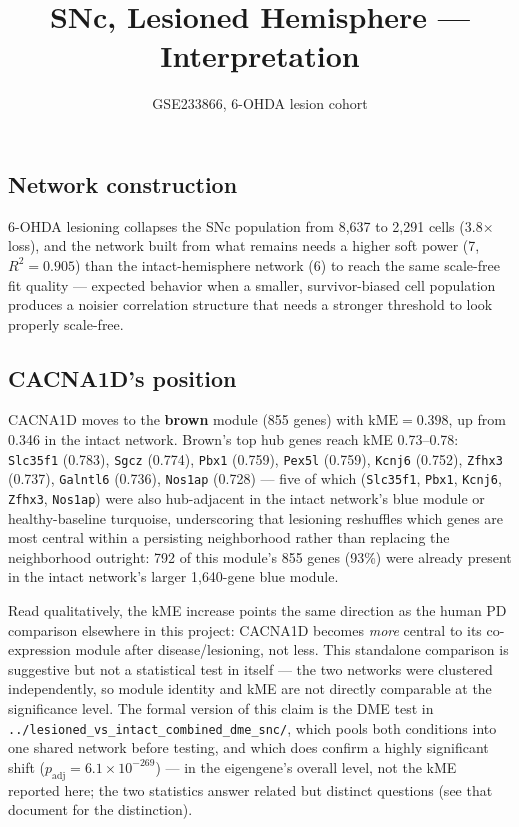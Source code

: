 \documentclass[11pt]{article}
\title{SNc, Lesioned Hemisphere --- Interpretation}
\author{GSE233866, 6-OHDA lesion cohort}
\date{}
\begin{document}
\maketitle

\subsection*{Network construction}

6-OHDA lesioning collapses the SNc population from 8{,}637 to 2{,}291 cells
(3.8$\times$ loss), and the network built from what remains needs a higher
soft power (7, $R^2=0.905$) than the intact-hemisphere network (6) to reach
the same scale-free fit quality --- expected behavior when a smaller,
survivor-biased cell population produces a noisier correlation structure
that needs a stronger threshold to look properly scale-free.

\subsection*{CACNA1D's position}

CACNA1D moves to the \textbf{brown} module (855 genes) with
$\mathrm{kME}=0.398$, up from 0.346 in the intact network. Brown's top hub
genes reach kME 0.73--0.78: \texttt{Slc35f1} (0.783), \texttt{Sgcz}
(0.774), \texttt{Pbx1} (0.759), \texttt{Pex5l} (0.759), \texttt{Kcnj6}
(0.752), \texttt{Zfhx3} (0.737), \texttt{Galntl6} (0.736), \texttt{Nos1ap}
(0.728) --- five of which (\texttt{Slc35f1}, \texttt{Pbx1}, \texttt{Kcnj6},
\texttt{Zfhx3}, \texttt{Nos1ap}) were also hub-adjacent in the intact
network's blue module or healthy-baseline turquoise, underscoring that
lesioning reshuffles which genes are most central within a persisting
neighborhood rather than replacing the neighborhood outright: 792 of this
module's 855 genes (93\%) were already present in the intact network's
larger 1{,}640-gene blue module.

Read qualitatively, the kME increase points the same direction as the
human PD comparison elsewhere in this project: CACNA1D becomes \emph{more}
central to its co-expression module after disease/lesioning, not less.
This standalone comparison is suggestive but not a statistical test in
itself --- the two networks were clustered independently, so module
identity and kME are not directly comparable at the significance level.
The formal version of this claim is the DME test in
\texttt{../lesioned\_vs\_intact\_combined\_dme\_snc/}, which pools both
conditions into one shared network before testing, and which does confirm
a highly significant shift ($p_{\mathrm{adj}}=6.1\times10^{-269}$) --- in
the eigengene's overall level, not the kME reported here; the two
statistics answer related but distinct questions (see that document for
the distinction).
\end{document}
